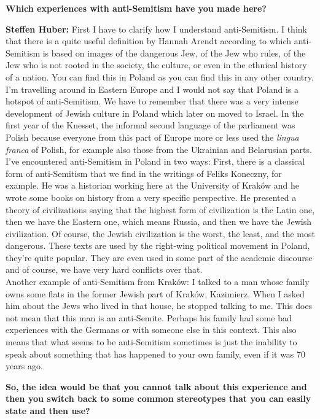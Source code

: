 \textbf{Which experiences with anti-Semitism have you made here? } 

\textbf{Steffen Huber:} First I have to clarify how I understand anti-Semitism. I think that there is a quite useful definition by Hannah Arendt according to which anti-Semitism is based on images of the dangerous Jew, of the Jew who rules, of the Jew who is not rooted in the society, the culture, or even in the ethnical history of a nation. You can find this in Poland as you can find this in any other country. I'm travelling around in Eastern Europe and I would not say that Poland is a hotspot of anti-Semitism. We have to remember that there was a very intense development of Jewish culture in Poland which later on moved to Israel. In the first year of the Knesset, the informal second language of the parliament was Polish because everyone from this part of Europe more or less used the \textit{lingua franca} of Polish, for example also those from the Ukrainian and Belarusian parts.\\
I've encountered anti-Semitism in Poland in two ways: First, there is a classical form of anti-Semitism that we find in the writings of Feliks Koneczny, for example. He was a historian working here at the University of Kraków and he wrote some books on history from a very specific perspective. He presented a theory of civilizations saying that the highest form of civilization is the Latin one, then we have the Eastern one, which means Russia, and then we have the Jewish civilization. Of course, the Jewish civilization is the worst, the least, and the most dangerous. These texts are used by the right-wing political movement in Poland, they're quite popular. They are even used in some part of the academic discourse and of course, we have very hard conflicts over that.\\
Another example of anti-Semitism from Kraków: I talked to a man whose family owns some flats in the former Jewish part of Kraków, Kazimierz. When I asked him about the Jews who lived in that house, he stopped talking to me. This does not mean that this man is an anti-Semite. Perhaps his family had some bad experiences with the Germans or with someone else in this context. This also means that what seems to be anti-Semitism sometimes is just the inability to speak about something that has happened to your own family, even if it was 70 years ago.

\textbf{So, the idea would be that you cannot talk about this experience and then you switch back to some common stereotypes that you can easily state and then use?} 


